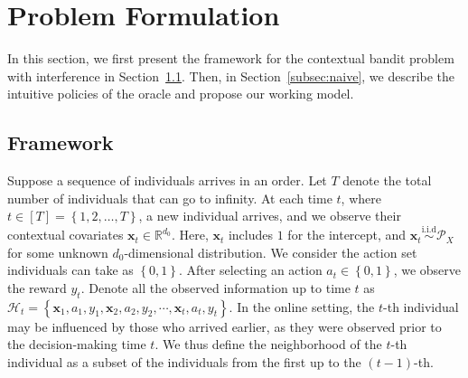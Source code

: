 \documentclass[12pt]{article}
\begin{document}
\section{Problem Formulation}
\label{sec:setup}
In this section, we first present the framework for the contextual bandit problem with interference in Section~\ref{subsec:framework}. Then, in Section~\ref{subsec:naive}, we describe the intuitive policies of the oracle and propose our working model.  

\subsection{Framework}
\label{subsec:framework} 

Suppose a sequence of individuals arrives in an order. Let $T$ denote the total number of individuals that can go to infinity. At each time $t$, where $t \in [T] = \left\{1, 2, \dots, T\right\}$, a new individual arrives, and we observe their contextual covariates $\bm{x}_t \in \mathbb{R}^{d_0}$. Here, $\bm{x}_t$ includes $1$ for the intercept, and $\bm{x}_t \stackrel{\text{i.i.d}}{\sim} \mathcal{P}_X$ for some unknown ${d_0}$-dimensional distribution. We consider the action set individuals can take as $\left\{0,1\right\}$. After selecting an action $a_t \in \left\{0,1\right\}$, we observe the reward $y_t$. Denote all the observed information up to time $t$ as $\mathcal{H}_{t} = \left\{\bm{x}_1, a_1, y_1, \bm{x}_2, a_2, y_2, \cdots, \bm{x}_t, a_t, y_t\right\}.$  In the online setting, the $t$-th individual may be influenced by those who arrived earlier, as they were observed prior to the decision-making time $t$. %
We thus define the neighborhood of the $t$-th individual as a subset of the individuals from the first up to the $(t-1)$-th. 
\end{document}
